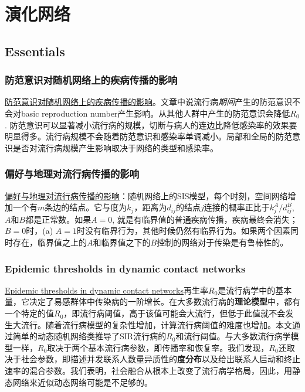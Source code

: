 \chapter{演化网络}

\section{Essentials}

\subsection{防范意识对随机网络上的疾病传播的影响}
\href{https://www.sciencedirect.com/science/article/pii/S002251931930459X}{防范意识对随机网络上的疾病传播的影响}。文章中说流行病\textit{期间}产生的防范意识不会对basic reproduction number产生影响。从其他人群中产生的防范意识会降低$R_0$. 防范意识可以显著减小流行病的规模，切断与病人的连边比降低感染率的效果要明显得多。流行病规模不会随着防范意识和感染率单调减小。局部和全局的防范意识是否对流行病规模产生影响取决于网络的类型和感染率。

\subsection{偏好与地理对流行病传播的影响}
\href{https://journals.aps.org/pre/abstract/10.1103/PhysRevE.76.056109}{偏好与地理对流行病传播的影响}：随机网络上的SIS模型，每个时刻，空间网络增加一个有$m$条边的结点。它与度为$k_j$，距离为$d_{ij}$的结点$j$连接的概率正比于$k^A_j/d^B_{ij}$, $A$和$B$都是正常数。如果$A=0$, 就是有临界值的普通疾病传播，疾病最终会消失；$B=0$时，(a) $A=1$时没有临界行为，其他时候仍然有临界行为。如果两个因素同时存在，临界值之上的$A$和临界值之下的$B$控制的网络对于传染是有鲁棒性的。

\subsection{Epidemic thresholds in dynamic contact networks}
\href{https://royalsocietypublishing.org/doi/pdf/10.1098/rsif.2008.0218}{Epidemic thresholds in dynamic contact networks}再生率$R_0$是流行病学中的基本量，它决定了易感群体中传染病的一阶增长。在大多数流行病的\textbf{理论模型}中，都有一个特定的值$R_0$，即流行病阈值，高于该值可能会大流行，但低于此值就不会发生大流行。随着流行病模型的复杂性增加，计算流行病阈值的难度也增加。本文通过简单的动态随机网络类推导了SIR流行病的$R_0$和流行阈值。与大多数流行病学模型一样，$R_0$取决于两个基本流行病参数，即传播率和恢复率。我们发现，$R_0$还取决于社会参数，即描述并发联系人数量异质性的\textbf{度分布}以及给出联系人启动和终止速率的混合参数。我们表明，社会融合从根本上改变了流行病学格局，因此，用静态网络来近似动态网络可能是不足够的。


